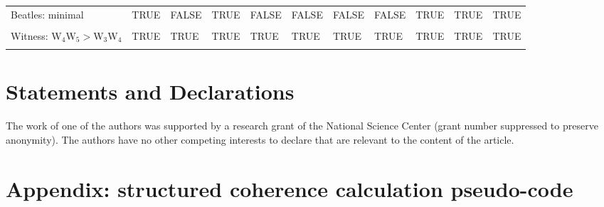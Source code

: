 \documentclass[
  10pt,
]{scrartcl}
\begin{document}
\begin{table}[H]
{\begin{tabular}[t]{lllllllllll}
Beatles: minimal & TRUE & FALSE & TRUE & FALSE & FALSE & FALSE & FALSE & TRUE & TRUE & TRUE\\
\cellcolor{gray!6}{Witness: W$_1$W$_2>$W$_3$W$_4$} & \cellcolor{gray!6}{TRUE} & \cellcolor{gray!6}{TRUE} & \cellcolor{gray!6}{TRUE} & \cellcolor{gray!6}{TRUE} & \cellcolor{gray!6}{TRUE} & \cellcolor{gray!6}{TRUE} & \cellcolor{gray!6}{TRUE} & \cellcolor{gray!6}{TRUE} & \cellcolor{gray!6}{TRUE} & \cellcolor{gray!6}{TRUE}\\
Witness: W$_4$W$_5>$W$_3$W$_4$ & TRUE & TRUE & TRUE & TRUE & TRUE & TRUE & TRUE & TRUE & TRUE & TRUE\\
\cellcolor{gray!6}{Success rate} & \cellcolor{gray!6}{50\%} & \cellcolor{gray!6}{50\%} & \cellcolor{gray!6}{67\%} & \cellcolor{gray!6}{50\%} & \cellcolor{gray!6}{50\%} & \cellcolor{gray!6}{67\%} & \cellcolor{gray!6}{67\%} & \cellcolor{gray!6}{100\%} & \cellcolor{gray!6}{91\%} & \cellcolor{gray!6}{100\%}\\
\bottomrule
\end{tabular}}
\end{table}

\hypertarget{statements-and-declarations}{%
\section{Statements and Declarations}\label{statements-and-declarations}}

The work of one of the authors was supported by a research grant of the National Science Center (grant number suppressed to preserve anonymity). The authors have no other competing interests to declare that are relevant to the content of the article.

\appendix
\section*{Appendix:  structured coherence calculation pseudo-code}
\end{document}
